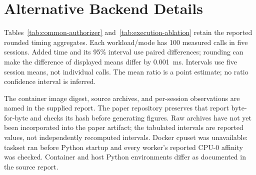 \section{Alternative Backend Details}
\label{app:backend-details}

Tables~\ref{tab:common-authorizer} and~\ref{tab:execution-ablation} retain the
reported rounded timing aggregates. Each workload/mode has 100 measured calls
in five sessions. Added time and its 95\% interval use paired differences;
rounding can make the difference of displayed means differ by 0.001~ms.
Intervals use five session means, not individual calls. The mean ratio is a
point estimate; no ratio confidence interval is inferred.

The container image digest, source archives, and per-session observations are
named in the supplied report. The paper repository preserves that report
byte-for-byte and checks its hash before generating figures. Raw archives have
not yet been incorporated into the paper artifact; the tabulated intervals are
reported values, not independently recomputed intervals. Docker cpuset was
unavailable: taskset ran before Python startup and every worker's reported
CPU-0 affinity was checked. Container and host Python environments differ as
documented in the source report.

